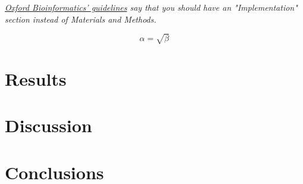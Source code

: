 \documentclass[titlepage]{article}
\begin{document}
\emph{\href{https://bmcbioinformatics.biomedcentral.com/submission-guidelines/preparing-your-manuscript/software-article}{Oxford Bioinformatics' guidelines} say that you should have an "Implementation" section instead of Materials and Methods.}

\begin{equation}
	\label{simple_equation}
	\alpha = \sqrt{ \beta }
\end{equation}

\section{Results}

\section{Discussion}

\section{Conclusions}
\end{document}

